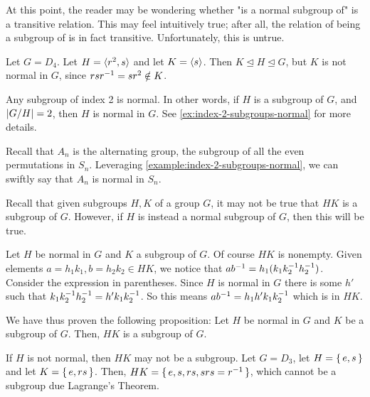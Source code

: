 \documentclass[./main.tex]{subfiles}
\begin{document}
At this point, the reader may be wondering whether "is a normal subgroup of" is
a transitive relation. This may feel intuitively true; after all, the relation
of being a subgroup of is in fact transitive. Unfortunately, this is untrue.

\begin{example}
    Let $G = D_4$. Let $H = { \langle r^2, s \rangle }$ and let $K = { \langle s \rangle }$. Then $K \unlhd
    H \unlhd G$, but $K$ is not normal in $G$, since $rsr^{-1} = sr^2 \notin K$.
\end{example}

\begin{example}
\label{example:index-2-subgroups-normal}
    Any subgroup of index 2 is normal. In other words, if $H$ is a subgroup of
    $G$, and $\abs{G/H} = 2$, then $H$ is normal in $G$. See
    \cref{ex:index-2-subgroups-normal} for more details.
\end{example}

\begin{example}
    Recall that $A_n$ is the alternating group, the subgroup of all the even
    permutations in $S_n$. Leveraging \cref{example:index-2-subgroups-normal},
    we can swiftly say that $A_n$ is normal in $S_n$. 
\end{example}

Recall that given subgroups $H, K$ of a group $G$, it may not be true that $HK$
is a subgroup of $G$. However, if $H$ is instead a normal subgroup of $G$, then
this will be true.

\begin{example}
\label{example:product-of-subgroup-with-normal-subgroup}
    Let $H$ be normal in $G$ and $K$ a subgroup of $G$. Of course $HK$ is
    nonempty. Given elements $a = h_1k_1, b = h_2k_2 \in HK$, we notice that
    $ab^{-1} = h_1 (k_1 k_2 ^{-1} h_2 ^{-1})$. Consider the expression in
    parentheses. Since $H$ is normal in $G$ there is some $h'$ such that $k_1
    k_2^{-1} h_2^{-1} = h' k_1 k_2^{-1}$. So this means $ab^{-1} = h_1 h' k_1
    k_2^{-1}$ which is in $HK$.

    We have thus proven the following proposition: Let $H$ be normal in $G$ and
    $K$ be a subgroup of $G$. Then, $HK$ is a subgroup of $G$.
\end{example}
\begin{warning}
    If $H$ is not normal, then $HK$ may not be a subgroup. Let $G = D_3$, let $H
    = \set{e,s}$ and let $K = \set{e, rs}$. Then, $HK = \set{e, s, rs,
    srs=r^{-1}}$, which cannot be a subgroup due Lagrange's Theorem.
\end{warning}
\end{document}
